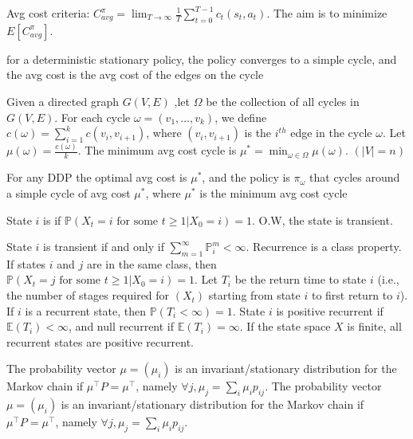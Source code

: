 
Avg cost criteria: $C_{avg}^\pi = \lim_{T \rightarrow \infty} \frac{1}{T} \sum_{t=0}^{T-1} c_t(s_t, a_t)$. The aim is to minimize $E[C_{avg}^\pi]$.

\begin{clm} for a deterministic stationary policy, the policy converges to a simple cycle, and the avg cost is the avg cost of the edges on the cycle\end{clm}

 Given a directed graph $G(V, E)$ ,let $\Omega$ be the collection of all cycles in $G(V, E)$. For each cycle $\omega = (v_1, \ldots , v_k)$, we define $c(\omega) = \sum_{i=1}^{k} c(v_i, v_{i+1})$, where $(v_i, v_{i+1})$ is the $i^{th}$ edge in the cycle $\omega$. Let $\mu(\omega) = \frac{c(\omega)}{k}$. The minimum avg cost cycle is $\mu^* = \min_{\omega \in \Omega} \mu(\omega).$ $(|V| = n)$

\begin{thm} For any DDP the optimal avg cost is $\mu^*$, and the policy is $\pi_\omega$ that cycles around a simple cycle of avg cost $\mu^*$, where $\mu^*$ is the minimum avg cost cycle\end{thm}
\begin{deff}
State $i$ is  if $\mathbb{P}(X_t = i \text{ for some } t \geq 1 | X_0 = i) = 1$. O.W, the state is transient.\end{deff}
\begin{clm}
State $i$ is transient if and only if $\sum_{m=1}^\infty \mathbb{P}_i^m < \infty$.
Recurrence is a class property.
If states $i$ and $j$ are in the same class, then $\mathbb{P}(X_t = j \text{ for some } t \geq 1 | X_0 = i) = 1$.
Let $T_i$ be the return time to state $i$ (i.e., the number of stages required for $(X_t)$ starting from state $i$ to first return to $i$). If $i$ is a recurrent state, then $\mathbb{P}(T_i < \infty) = 1$.
State $i$ is positive recurrent if $\mathbb{E}(T_i) < \infty$, and null recurrent if $\mathbb{E}(T_i) = \infty$. If the state space $X$ is finite, all recurrent states are positive recurrent.\end{clm}

\begin{thm}
The probability vector $\mu = (\mu_i)$ is an invariant/stationary distribution for the Markov chain if $\mu^\top P = \mu^\top$, namely $\forall j, \mu_j = \sum_i \mu_i p_{ij}$.
The probability vector $\mu = (\mu_i)$ is an invariant/stationary distribution for the Markov chain if $\mu^\top P = \mu^\top$, namely $\forall j, \mu_j = \sum_i \mu_i p_{ij}$.\end{thm}

